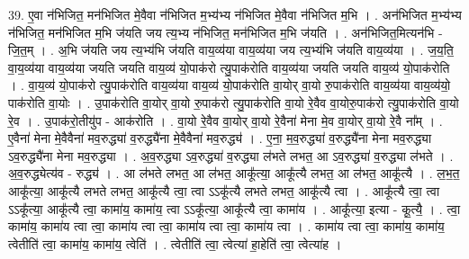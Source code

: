 \documentclass[17pt]{extarticle}
\begin{document}
39. ए॒वा न॑भिजित॒ मन॑भिजित मे॒वैवा न॑भिजित म॒भ्य॑भ्य न॑भिजित मे॒वैवा न॑भिजित म॒भि । . अन॑भिजित म॒भ्य॑भ्य न॑भिजित॒ मन॑भिजित म॒भि ज॑यति जय त्य॒भ्य न॑भिजित॒ मन॑भिजित म॒भि ज॑यति । . अन॑भिजित॒मित्यन॑भि - जि॒त॒म् । . अ॒भि ज॑यति जय त्य॒भ्य॑भि ज॑यति वाय॒व्य॑या वाय॒व्य॑या जय त्य॒भ्य॑भि ज॑यति वाय॒व्य॑या । . ज॒य॒ति॒ वा॒य॒व्य॑या वाय॒व्य॑या जयति जयति वाय॒व्य॑ यो॒पाक॑रो त्यु॒पाक॑रोति वाय॒व्य॑या जयति जयति वाय॒व्य॑ यो॒पाक॑रोति । . वा॒य॒व्य॑ यो॒पाक॑रो त्यु॒पाक॑रोति वाय॒व्य॑या वाय॒व्य॑ यो॒पाक॑रोति वा॒योर् वा॒यो रु॒पाक॑रोति वाय॒व्य॑या वाय॒व्य॑यो॒ पाक॑रोति वा॒योः । . उ॒पाक॑रोति वा॒योर् वा॒यो रु॒पाक॑रो त्यु॒पाक॑रोति वा॒यो रे॒वैव वा॒योरु॒पाक॑रो त्यु॒पाक॑रोति वा॒यो रे॒व । . उ॒पाक॑रो॒तीयु॑प - आक॑रोति । . वा॒यो रे॒वैव वा॒योर् वा॒यो रे॒वैना॑ मेना मे॒व वा॒योर् वा॒यो रे॒वै ना᳚म् । . ए॒वैना॑ मेना मे॒वैवैना॑ मव॒रुद्ध्या॑ व॒रुद्ध्यै॑ना मे॒वैवैना॑ मव॒रुद्ध्य॑ । . ए॒ना॒ म॒व॒रुद्ध्या॑ व॒रुद्ध्यै॑ना मेना मव॒रुद्ध्या ऽव॒रुद्ध्यै॑ना मेना मव॒रुद्ध्या । . अ॒व॒रुद्ध्या ऽव॒रुद्ध्या॑ व॒रुद्ध्या ल॑भते लभत॒ आ ऽव॒रुद्ध्या॑ व॒रुद्ध्या ल॑भते । . अ॒व॒रुद्ध्येत्य॑व - रुद्ध्य॑ । . आ ल॑भते लभत॒ आ ल॑भत॒ आकू᳚त्या॒ आकू᳚त्यै लभत॒ आ ल॑भत॒ आकू᳚त्यै । . ल॒भ॒त॒ आकू᳚त्या॒ आकू᳚त्यै लभते लभत॒ आकू᳚त्यै त्वा॒ त्वा ऽऽकू᳚त्यै लभते लभत॒ आकू᳚त्यै त्वा । . आकू᳚त्यै त्वा॒ त्वा ऽऽकू᳚त्या॒ आकू᳚त्यै त्वा॒ कामा॑य॒ कामा॑य॒ त्वा ऽऽकू᳚त्या॒ आकू᳚त्यै त्वा॒ कामा॑य । . आकू᳚त्या॒ इत्या - कू॒त्यै॒ । . त्वा॒ कामा॑य॒ कामा॑य त्वा त्वा॒ कामा॑य त्वा त्वा॒ कामा॑य त्वा त्वा॒ कामा॑य त्वा । . कामा॑य त्वा त्वा॒ कामा॑य॒ कामा॑य॒ त्वेतीति॑ त्वा॒ कामा॑य॒ कामा॑य॒ त्वेति॑ । . त्वेतीति॑ त्वा॒ त्वेत्या॑ हा॒हेति॑ त्वा॒ त्वेत्या॑ह । \newline
\pagebreak
{}
\end{document}
